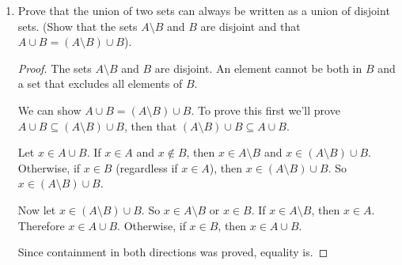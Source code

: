 \documentclass[12pt]{article}
\begin{document}
\begin{enumerate}
		(c \#2) Prove that $A\triangle \emptyset =A$.
		\begin{proof}
			Let $x\in A\triangle \emptyset$, then $x\in (A\setminus \emptyset)\cup(\emptyset\setminus A)$. Since $x\in A\setminus\emptyset$, $x\in A$, so $A\triangle\emptyset\subseteq A$.
			Now let $x\in A$. Therefore $x\in A\setminus\emptyset$, and $x\in (A\setminus\emptyset)\cup(\emptyset\setminus A)$. So $A\subseteq A\triangle\emptyset$.
			Together we have proven that $A\triangle \emptyset =A$.
		\end{proof}
	
		\newpage
	
		(d) Prove that for sets $A$, $B$, we have $A\triangle B=A\setminus B$ if and only if $B\subseteq A$.
		\begin{proof}
			First we will prove that if $A\triangle B=A\setminus B$, then $B\subseteq A$. Let $x\in B$. Considering $(A\setminus B)\cup (B\setminus A)=A\setminus B$, the only way for this equality to work is if  $B\setminus A =\emptyset$. If $B\setminus A=\emptyset$, that means all elements in $B$ are a part of $A$. Hence $x\in A$ and $B\subseteq A$.
			
			Now we'll prove that if $B\subseteq A$, then $A\triangle B=A\setminus B$. Let $x\in A\triangle B$, so $x\in (A\setminus B)\cup(B\setminus A)$. Since $B\subseteq A$, $B\setminus A=\emptyset$. Thus $x\in A\setminus B$, therefore $A\triangle B\subseteq A\setminus B$. Now let $x\in A\setminus B$, then $x\in (A\setminus B)\cup(B\setminus A)$. Hence $x\in A\triangle B$, and $A\setminus B\subseteq A\triangle B$.
			
			Both directions of implication were proved, thus proving equivalence.
		\end{proof}
		
		\item Prove that the union of two sets can always be written as a union of disjoint sets. (Show that the sets $A\setminus B$ and $B$ are disjoint and that $A\cup B=(A\setminus B)\cup B$).
		
		\begin{proof}
			The sets $A\setminus B$ and $B$ are disjoint. An element cannot be both in $B$ and a set that excludes all elements of $B$.
			
			We can show $A\cup B=(A\setminus B)\cup B$. To prove this first we'll prove $A\cup B\subseteq (A\setminus B)\cup B$, then that $(A\setminus B)\cup B\subseteq A\cup B$.
			
			Let $x\in A\cup B$. If $x\in A$ and $x\not\in B$, then $x\in A\setminus B$ and $x\in (A\setminus B)\cup B$. Otherwise, if $x\in B$ (regardless if $x\in A$), then $x\in (A\setminus B)\cup B$. So $x\in (A\setminus B)\cup B$.
			
			Now let $x\in (A\setminus B)\cup B$. So $x\in A\setminus B$ or $x\in B$. If $x\in A\setminus B$, then $x\in A$. Therefore $x\in A\cup B$. Otherwise, if $x\in B$, then $x\in A\cup B$.
			
			Since containment in both directions was proved, equality is.
		\end{proof}
		\end{enumerate}
\end{document}
